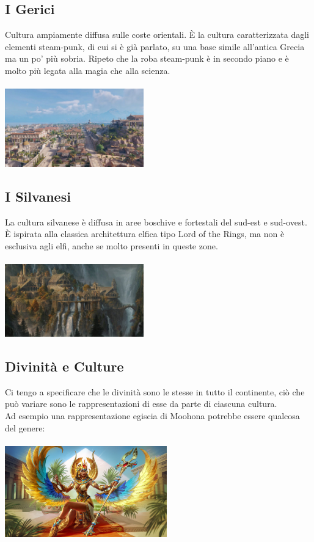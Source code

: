 \documentclass[10pt, a4paper]{report}
\begin{document}
\begin{multicols}{2}
\subsection*{I Gerici}
Cultura ampiamente diffusa sulle coste orientali. È la cultura caratterizzata dagli elementi steam-punk, di cui si è già parlato, su una base simile all'antica Grecia ma un po' più sobria. Ripeto che la roba steam-punk è in secondo piano e è molto più legata alla magia che alla scienza.\\
\\
\includegraphics[width=6cm]{gerici.jpg}	

\subsection*{I Silvanesi}
La cultura silvanese è diffusa in aree boschive e fortestali del sud-est e sud-ovest. È ispirata alla classica architettura elfica tipo Lord of the Rings, ma non è esclusiva agli elfi, anche se molto presenti in queste zone.\\
\\
\includegraphics[width=6cm]{silvanese.png}

\subsection*{Divinità e Culture}
Ci tengo a specificare che le divinità sono le stesse in tutto il continente, ciò che può variare sono le rappresentazioni di esse da parte di ciascuna cultura. \\
Ad esempio una rappresentazione egiscia di Moohona potrebbe essere qualcosa del genere:\\
\\

\includegraphics[width=7cm]{moonaegisci.jpg}
\end{multicols}
\end{document}
